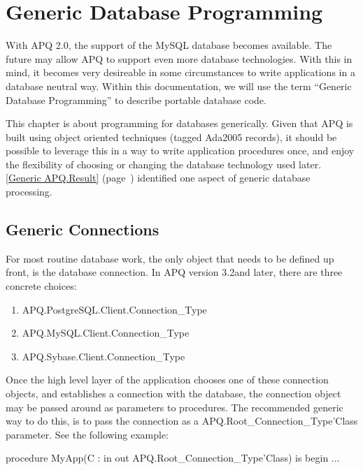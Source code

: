 \documentclass[english,letterpaper]{book}
\newcommand\Ref[1]{\textsection\ref{#1} (page~\pageref{#1})}
\newcommand\apqversion{3.2}
\begin{document}
\chapter{Generic Database Programming}

With APQ 2.0, the support of the MySQL database becomes available.
The future may allow APQ to support even more database technologies.
With this in mind, it becomes very desireable in some circumstances
to write applications in a database neutral way. Within this documentation,
we will use the term ``Generic Database Programming'' to describe
portable database code.

This chapter is about programming for databases generically. Given
that APQ is built using object oriented techniques (tagged Ada2005 records),
it should be possible to leverage this in a way to write application
procedures once, and enjoy the flexibility of choosing or changing
the database technology used later. \Ref{Generic APQ.Result}
identified one aspect of generic database processing.


\section{Generic Connections}

For most routine database work, the only object that needs to be defined
up front, is the database connection. In APQ version \apqversion and later,
there are three concrete choices:

\begin{enumerate}
   \item APQ.PostgreSQL.Client.Connection\_Type
   \item APQ.MySQL.Client.Connection\_Type
   \item APQ.Sybase.Client.Connection\_Type
\end{enumerate}

Once the high level layer of the application chooses one of these
connection objects, and establishes a connection with the database,
the connection object may be passed around as parameters to procedures.
The recommended generic way to do this, is to pass the connection
as a APQ\-.Root\_Connection\_Type\-'Class parameter. See the following
example:

\begin{Example}
procedure MyApp(C : in out APQ.Root_Connection_Type'Class) is
begin
   ...
\end{Example}
\end{document}

